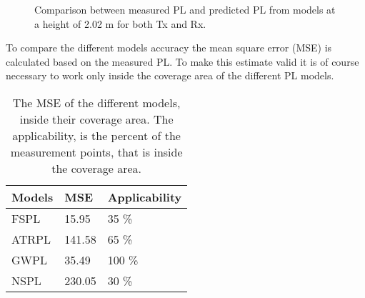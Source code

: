 \begin{figure}[H]
\centering

\caption{Comparison between measured PL and predicted PL from models at a height of 2.02 m for both Tx and Rx.}
\label{Models10}
\end{figure}





To compare the different models accuracy the mean square error (MSE) is calculated based on the measured PL. To make this estimate valid it is of course necessary to work only inside the coverage area of the different PL models. 




\begin{table}[!htbp]
\centering
\caption{The MSE of the different models, inside their coverage area. The applicability, is the percent of the measurement points, that is inside the coverage area.}
\label{model_comparison}
\begin{tabular}{|l|l|l|}
\hline
\textbf{Models} & \textbf{MSE} & \textbf{Applicability} \\ \hline
FSPL            & 15.95        & 35 \%                  \\ \hline
ATRPL 		    & 141.58       & 65 \%                  \\ \hline %
GWPL            & 35.49        & 100 \%                 \\ \hline
NSPL            & 230.05       & 30 \%                  \\ \hline
\end{tabular}

\end{table}





